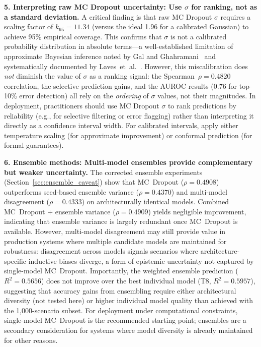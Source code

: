 \textbf{5. Interpreting raw MC Dropout uncertainty: Use $\sigma$ for ranking, not as a standard deviation.} A critical finding is that raw MC Dropout $\sigma$ requires a scaling factor of $k_{95} = 11.34$ (versus the ideal 1.96 for a calibrated Gaussian) to achieve 95\% empirical coverage. This confirms that $\sigma$ is not a calibrated probability distribution in absolute terms---a well-established limitation of approximate Bayesian inference noted by Gal and Ghahramani~\cite{gal2016dropout} and systematically documented by Laves~et~al.~\cite{laves2020well}. However, this miscalibration does \emph{not} diminish the value of $\sigma$ as a ranking signal: the Spearman~$\rho = 0.4820$ correlation, the selective prediction gains, and the AUROC results (0.76 for top-10\% error detection) all rely on the \emph{ordering} of $\sigma$ values, not their magnitudes. In deployment, practitioners should use MC Dropout $\sigma$ to rank predictions by reliability (e.g., for selective filtering or error flagging) rather than interpreting it directly as a confidence interval width. For calibrated intervals, apply either temperature scaling (for approximate improvement) or conformal prediction (for formal guarantees).

\textbf{6. Ensemble methods: Multi-model ensembles provide complementary but weaker uncertainty.} The corrected ensemble experiments (Section~\ref{sec:ensemble_caveat}) show that MC~Dropout ($\rho = 0.4908$) outperforms seed-based ensemble variance ($\rho = 0.4370$) and multi-model disagreement ($\rho = 0.4333$) on architecturally identical models. Combined MC~Dropout + ensemble variance ($\rho = 0.4909$) yields negligible improvement, indicating that ensemble variance is largely redundant once MC~Dropout is available. However, multi-model disagreement may still provide value in production systems where multiple candidate models are maintained for robustness: disagreement across models signals scenarios where architecture-specific inductive biases diverge, a form of epistemic uncertainty not captured by single-model MC~Dropout. Importantly, the weighted ensemble prediction ($R^2 = 0.5656$) does not improve over the best individual model (T8, $R^2 = 0.5957$), suggesting that accuracy gains from ensembling require either architectural diversity (not tested here) or higher individual model quality than achieved with the 1,000-scenario subset. For deployment under computational constraints, single-model MC~Dropout is the recommended starting point; ensembles are a secondary consideration for systems where model diversity is already maintained for other reasons.


